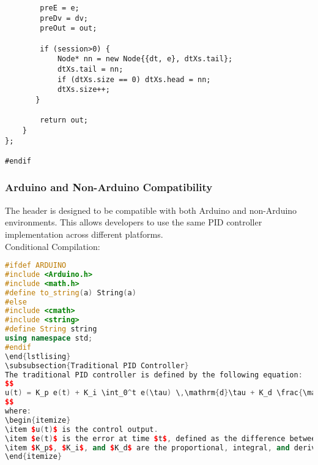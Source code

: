 \documentclass[a4paper,12pt]{article}
\begin{document}
\begin{lstlising}[language=C++]
\begin{lstlisting}
        preE = e;
        preDv = dv;
        preOut = out;

        if (session>0) {
            Node* nn = new Node{{dt, e}, dtXs.tail};
            dtXs.tail = nn;
            if (dtXs.size == 0) dtXs.head = nn;
            dtXs.size++;
       } 

        return out;
    }
};

#endif
\end{lstlisting}
\subsubsection{Arduino and Non-Arduino Compatibility}
The header is designed to be compatible with both Arduino and non-Arduino environments. This allows developers to use the same PID controller implementation across different platforms.\\
Conditional Compilation:
\begin{lstlisting}[language=C++]
#ifdef ARDUINO
#include <Arduino.h>
#include <math.h>
#define to_string(a) String(a)
#else
#include <cmath>
#include <string>
#define String string
using namespace std;
#endif
\end{lstlising}
\subsubsection{Traditional PID Controller}
The traditional PID controller is defined by the following equation:
$$
u(t) = K_p e(t) + K_i \int_0^t e(\tau) \,\mathrm{d}\tau + K_d \frac{\mathrm{d}e(t)}{\mathrm{d}t},
$$
where:
\begin{itemize}
\item $u(t)$ is the control output.
\item $e(t)$ is the error at time $t$, defined as the difference between the desired value and the measured value.
\item $K_p$, $K_i$, and $K_d$ are the proportional, integral, and derivative gains, respectively.
\end{itemize}

\end{lstlisting}
\end{lstlising}
\end{document}
